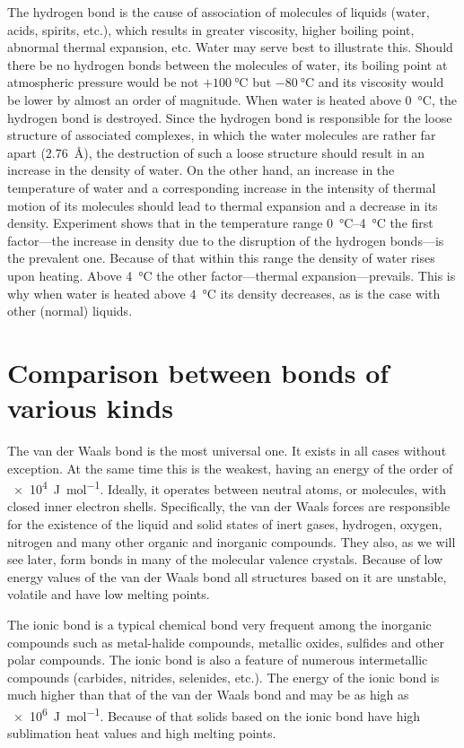 The hydrogen bond is the cause of association of molecules of liquids (water, acids, spirits, etc.), which results in greater viscosity, higher boiling point, abnormal thermal expansion, etc. Water may serve best to illustrate this. Should there be no hydrogen bonds between the molecules of water, its boiling point at atmospheric pressure would be not $+\SI{100}{\degreeCelsius}$ but $-\SI{80}{\degreeCelsius}$ and its viscosity would be lower by almost an order of magnitude. When water is heated above \SI{0}{\degreeCelsius}, the hydrogen bond is destroyed. Since the hydrogen bond is responsible for the loose structure of associated complexes, in which the water molecules are rather far apart (\SI{2.76}{\angstrom}), the destruction of such a loose structure should result in an increase in the density of water. On the other hand, an increase in the temperature of water and a corresponding increase in the intensity of thermal motion of its molecules should lead to thermal expansion and a decrease in its density. Experiment shows that in the temperature range \SIrange{0}{4}{\degreeCelsius} the first factor---the increase in density due to the disruption of the hydrogen bonds---is the prevalent one. Because of that within this range the density of water rises upon heating. Above \SI{4}{\degreeCelsius} the other factor---thermal expansion---prevails. This is why when water is heated above \SI{4}{\degreeCelsius} its density decreases, as is the case with other (normal) liquids.

\section{Comparison between bonds of various kinds}\label{sec:6}

The van der Waals bond is the most universal one. It exists in all cases without exception. At the same time this is the weakest, having an energy of the order of \SI{e4}{\joule\per\mole}. Ideally, it operates between neutral atoms, or molecules, with closed inner electron shells. Specifically, the van der Waals forces are responsible for the existence of the liquid and solid states of inert gases, hydrogen, oxygen, nitrogen and many other organic and inorganic compounds. They also, as we will see later, form bonds in many of the molecular valence crystals. Because of low energy values of the van der Waals bond all structures based on it are unstable, volatile and have low melting points.

The ionic bond is a typical chemical bond very frequent among the inorganic compounds such as metal-halide compounds, metallic oxides, sulfides and other polar compounds. The ionic bond is also a feature of numerous intermetallic compounds (carbides, nitrides, selenides, etc.). The energy of the ionic bond is much higher than that of the van der Waals bond and may be as high as \SI{e6}{\joule\per\mole}. Because of that solids based on the ionic bond have high sublimation heat values and high melting points.

